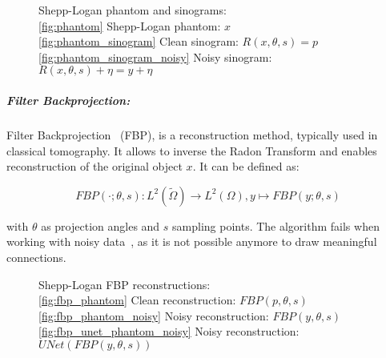 \begin{figure}[H]
    \label{fig:phantom_and_sinos}
    \hfill
    \hfill
    \hfill
    \hfill
	\caption{Shepp-Logan phantom and sinograms: \\
    \ref{fig:phantom} Shepp-Logan phantom: $x$ \\
    \ref{fig:phantom_sinogram} Clean sinogram: $R(x, \theta, s) = p$ \\
    \ref{fig:phantom_sinogram_noisy} Noisy sinogram: $R(x, \theta, s) + \eta = y + \eta$ 
    }
\end{figure}

\subparagraph{Filter Backprojection:}
Filter Backprojection~\cite{tomographicReconstruction} (FBP), 
is a reconstruction method, typically used in classical tomography.
It allows to inverse the Radon Transform and enables reconstruction of the original object $x$.
It can be defined as:

\begin{equation}
    \label{eq:fbp}
    \textit{FBP}(\cdot; \theta, s) : L^2(\tilde{\Omega}) \to L^2(\Omega), y \mapsto \textit{FBP}(y; \theta, s)
\end{equation}

with $\theta$ as projection angles and $s$ sampling points. 
The algorithm fails when working with noisy data~\cite{cryoEmMath2}, as it is not possible anymore to draw meaningful connections.

\begin{figure}[h]
    \label{fig:phantom_fbps}
    \hfill
    \hfill
    \hfill
    \hfill
	\caption{Shepp-Logan FBP reconstructions: \\
    \ref{fig:fbp_phantom} Clean reconstruction: $\textit{FBP}(p, \theta, s)$  \\
    \ref{fig:fbp_phantom_noisy} Noisy reconstruction: $\textit{FBP}(y, \theta, s)$ \\
    \ref{fig:fbp_unet_phantom_noisy} Noisy reconstruction: $\textit{UNet}(\textit{FBP}(y, \theta, s))$ 
    }
\end{figure}

